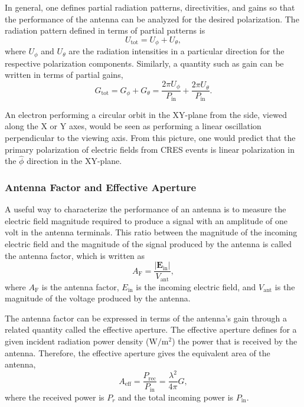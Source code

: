 In general, one defines partial radiation patterns, directivities, and gains so that the performance of the antenna can be analyzed for the desired polarization. The radiation pattern defined in terms of partial patterns is
\begin{equation}
    U_\mathrm{tot}=U_\phi + U_\theta,
\end{equation}
where $U_\phi$ and $U_\theta$ are the radiation intensities in a particular direction for the respective polarization components. Similarly, a quantity such as gain can be written in terms of partial gains,
\begin{equation}
    G_\mathrm{tot}=G_\phi+G_\theta=\frac{2\pi U_\phi}{P_\mathrm{in}}+\frac{2\pi U_\theta}{P_\mathrm{in}}.
\end{equation}

An electron performing a circular orbit in the XY-plane from the side, viewed along the X or Y axes, would be seen as performing a linear oscillation perpendicular to the viewing axis. From this picture, one would predict that the primary polarization of electric fields from CRES events is linear polarization in the $\hat\phi$ direction in the XY-plane.

\subsubsection{Antenna Factor and Effective Aperture}
\label{sec:ant-factor}
A useful way to characterize the performance of an antenna is to measure the electric field magnitude required to produce a signal with an amplitude of one volt in the antenna terminals. This ratio between the magnitude of the incoming electric field and the magnitude of the signal produced by the antenna is called the antenna factor, which is written as
\begin{equation}
    A_\mathrm{F} = \frac{|\mathbf{E}_\mathrm{in}|}{V_\mathrm{ant}},
    \label{eq:antenna-factor}
\end{equation}
where $A_\mathrm{F}$ is the antenna factor, $E_\mathrm{in}$ is the incoming electric field, and $V_\mathrm{ant}$ is the magnitude of the voltage produced by the antenna.

The antenna factor can be expressed in terms of the antenna's gain through a related quantity called the effective aperture. The effective aperture defines for a given incident radiation power density ($\mathrm{W}/\mathrm{m}^2$) the power that is received by the antenna. Therefore, the effective aperture gives the equivalent area of the antenna,
\begin{equation}
    A_\mathrm{eff}=\frac{P_\mathrm{rec}}{P_\mathrm{in}}=\frac{\lambda^2}{4\pi}G,
\end{equation}
where the received power is $P_r$ and the total incoming power is $P_\mathrm{in}$.

